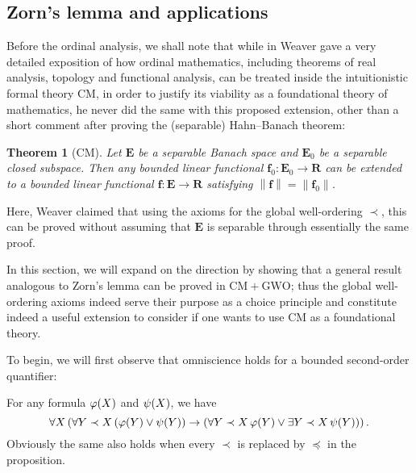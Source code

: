 \documentclass[11pt]{article}
\theoremstyle{plain}
\newtheorem*{theorem*}{Theorem}
\theoremstyle{definition}
\begin{document}
\subsection{Zorn's lemma and applications}

Before the ordinal analysis, we shall note that while in \cite{weaver09-cm} Weaver gave a very detailed exposition of how ordinal mathematics, including theorems of real analysis, topology and functional analysis, can be treated inside the intuitionistic formal theory $\mathrm{CM}$, in order to justify its viability as a foundational theory of mathematics, he never did the same with this proposed extension, other than a short comment after proving the (separable) Hahn--Banach theorem:

\begin{theorem*}[$\mathrm{CM}$]
    Let $\mathbf{E}$ be a separable Banach space and $\mathbf{E}_0$ be a separable closed subspace. Then any bounded linear functional $\mathbf{f}_0 : \mathbf{E}_0 \rightarrow \mathbf{R}$ can be extended to a bounded linear functional $\mathbf{f} : \mathbf{E} \rightarrow \mathbf{R}$ satisfying $\left\|\mathbf{f}\right\| = \left\|\mathbf{f}_0\right\|$.
\end{theorem*}

Here, Weaver claimed that using the axioms for the global well-ordering $\prec$, this can be proved without assuming that $\mathbf{E}$ is separable through essentially the same proof.

In this section, we will expand on the direction by showing that a general result analogous to Zorn's lemma can be proved in $\mathrm{CM} + \mathrm{GWO}$; thus the global well-ordering axioms indeed serve their purpose as a choice principle and constitute indeed a useful extension to consider if one wants to use $\mathrm{CM}$ as a foundational theory.

To begin, we will first observe that omniscience holds for a bounded second-order quantifier:

\begin{lemma}
    \label{lem:bounded-second-order-omni}
    For any formula $\varphi\mleft(X\mright)$ and $\psi\mleft(X\mright)$, we have
    \[\forall X \left(\forall Y \prec X \left(\varphi\mleft(Y\mright) \lor \psi\mleft(Y\mright)\right) \rightarrow \left(\forall Y \prec X \, \varphi\mleft(Y\mright) \lor \exists Y \prec X \, \psi\mleft(Y\mright)\right)\right).\]
    Obviously the same also holds when every $\prec$ is replaced by $\preceq$ in the proposition.
\end{lemma}
\end{document}
